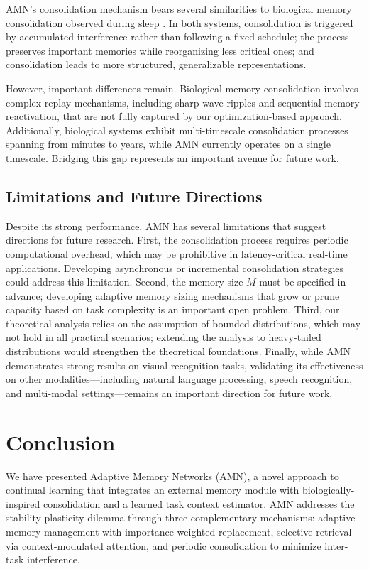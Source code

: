 \documentclass[11pt]{article}
\begin{document}
AMN's consolidation mechanism bears several similarities to biological memory consolidation observed during sleep \citep{walker2017sleep}. In both systems, consolidation is triggered by accumulated interference rather than following a fixed schedule; the process preserves important memories while reorganizing less critical ones; and consolidation leads to more structured, generalizable representations.

However, important differences remain. Biological memory consolidation involves complex replay mechanisms, including sharp-wave ripples and sequential memory reactivation, that are not fully captured by our optimization-based approach. Additionally, biological systems exhibit multi-timescale consolidation processes spanning from minutes to years, while AMN currently operates on a single timescale. Bridging this gap represents an important avenue for future work.

\subsection{Limitations and Future Directions}

Despite its strong performance, AMN has several limitations that suggest directions for future research. First, the consolidation process requires periodic computational overhead, which may be prohibitive in latency-critical real-time applications. Developing asynchronous or incremental consolidation strategies could address this limitation. Second, the memory size $M$ must be specified in advance; developing adaptive memory sizing mechanisms that grow or prune capacity based on task complexity is an important open problem. Third, our theoretical analysis relies on the assumption of bounded distributions, which may not hold in all practical scenarios; extending the analysis to heavy-tailed distributions would strengthen the theoretical foundations. Finally, while AMN demonstrates strong results on visual recognition tasks, validating its effectiveness on other modalities---including natural language processing, speech recognition, and multi-modal settings---remains an important direction for future work.

\section{Conclusion}
\label{sec:conclusion}

We have presented Adaptive Memory Networks (AMN), a novel approach to continual learning that integrates an external memory module with biologically-inspired consolidation and a learned task context estimator. AMN addresses the stability-plasticity dilemma through three complementary mechanisms: adaptive memory management with importance-weighted replacement, selective retrieval via context-modulated attention, and periodic consolidation to minimize inter-task interference.
\end{document}
